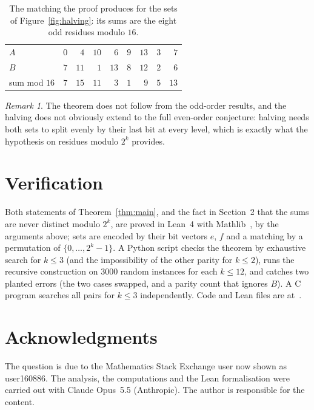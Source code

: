 \documentclass[11pt]{amsart}
\theoremstyle{remark}
\newtheorem{remark}[theorem]{Remark}
\begin{document}
\begin{table}[ht]
\centering
\begin{tabular}{l|rrrrrrrr}
\hline
$A$ & $0$ & $4$ & $10$ & $6$ & $9$ & $13$ & $3$ & $7$\\
$B$ & $7$ & $11$ & $1$ & $13$ & $8$ & $12$ & $2$ & $6$\\
\hline
sum mod $16$ & $7$ & $15$ & $11$ & $3$ & $1$ & $9$ & $5$ & $13$\\
\hline
\end{tabular}
\caption{The matching the proof produces for the sets of Figure~\ref{fig:halving}: its sums are the eight odd residues modulo $16$.}
\label{tab:ex}
\end{table}

\begin{remark}
The theorem does not follow from the odd-order results, and the halving does not obviously extend to the full even-order conjecture: halving needs both sets to split evenly by their last bit at every level, which is exactly what the hypothesis on residues modulo $2^k$ provides.
\end{remark}

\section{Verification}

Both statements of Theorem~\ref{thm:main}, and the fact in Section~2 that the sums are never distinct modulo $2^k$, are proved in Lean~4 with Mathlib~\cite{mathlib}, by the arguments above; sets are encoded by their bit vectors $e$, $f$ and a matching by a permutation of $\{0,\dots,2^k-1\}$. A Python script checks the theorem by exhaustive search for $k\le3$ (and the impossibility of the other parity for $k\le2$), runs the recursive construction on $3000$ random instances for each $k\le12$, and catches two planted errors (the two cases swapped, and a parity count that ignores $B$). A C program searches all pairs for $k\le3$ independently. Code and Lean files are at~\cite{repo}.

\section*{Acknowledgments}

The question is due to the Mathematics Stack Exchange user now shown as user160886. The analysis, the computations and the Lean formalisation were carried out with Claude Opus~5.5 (Anthropic). The author is responsible for the content.
\end{document}
